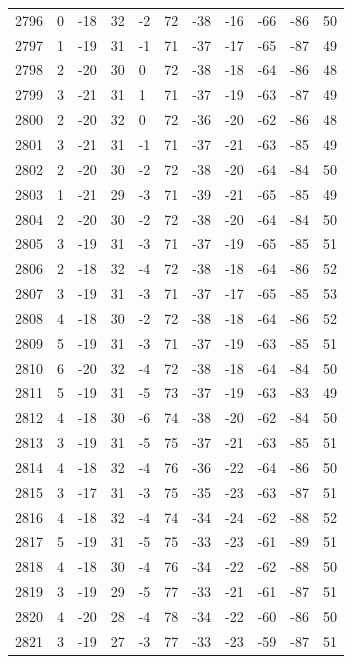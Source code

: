 \begin{table}[H]
\begin{tabular}{lllllllllll}
2796 & 0 & -18 & 32 & -2 & 72 & -38 & -16 & -66 & -86 & 50 \\
2797 & 1 & -19 & 31 & -1 & 71 & -37 & -17 & -65 & -87 & 49 \\
2798 & 2 & -20 & 30 & 0 & 72 & -38 & -18 & -64 & -86 & 48 \\
2799 & 3 & -21 & 31 & 1 & 71 & -37 & -19 & -63 & -87 & 49 \\
2800 & 2 & -20 & 32 & 0 & 72 & -36 & -20 & -62 & -86 & 48 \\
2801 & 3 & -21 & 31 & -1 & 71 & -37 & -21 & -63 & -85 & 49 \\
2802 & 2 & -20 & 30 & -2 & 72 & -38 & -20 & -64 & -84 & 50 \\
2803 & 1 & -21 & 29 & -3 & 71 & -39 & -21 & -65 & -85 & 49 \\
2804 & 2 & -20 & 30 & -2 & 72 & -38 & -20 & -64 & -84 & 50 \\
2805 & 3 & -19 & 31 & -3 & 71 & -37 & -19 & -65 & -85 & 51 \\
2806 & 2 & -18 & 32 & -4 & 72 & -38 & -18 & -64 & -86 & 52 \\
2807 & 3 & -19 & 31 & -3 & 71 & -37 & -17 & -65 & -85 & 53 \\
2808 & 4 & -18 & 30 & -2 & 72 & -38 & -18 & -64 & -86 & 52 \\
2809 & 5 & -19 & 31 & -3 & 71 & -37 & -19 & -63 & -85 & 51 \\
2810 & 6 & -20 & 32 & -4 & 72 & -38 & -18 & -64 & -84 & 50 \\
2811 & 5 & -19 & 31 & -5 & 73 & -37 & -19 & -63 & -83 & 49 \\
2812 & 4 & -18 & 30 & -6 & 74 & -38 & -20 & -62 & -84 & 50 \\
2813 & 3 & -19 & 31 & -5 & 75 & -37 & -21 & -63 & -85 & 51 \\
2814 & 4 & -18 & 32 & -4 & 76 & -36 & -22 & -64 & -86 & 50 \\
2815 & 3 & -17 & 31 & -3 & 75 & -35 & -23 & -63 & -87 & 51 \\
2816 & 4 & -18 & 32 & -4 & 74 & -34 & -24 & -62 & -88 & 52 \\
2817 & 5 & -19 & 31 & -5 & 75 & -33 & -23 & -61 & -89 & 51 \\
2818 & 4 & -18 & 30 & -4 & 76 & -34 & -22 & -62 & -88 & 50 \\
2819 & 3 & -19 & 29 & -5 & 77 & -33 & -21 & -61 & -87 & 51 \\
2820 & 4 & -20 & 28 & -4 & 78 & -34 & -22 & -60 & -86 & 50 \\
2821 & 3 & -19 & 27 & -3 & 77 & -33 & -23 & -59 & -87 & 51 \\

\end{tabular}
\end{table}
